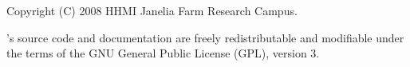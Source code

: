 \vspace*{\fill}
\begin{flushleft}
Copyright (C) 2008 HHMI Janelia Farm Research Campus.

\vspace{2em} 

's source code and documentation are freely
redistributable and modifiable under the terms of the GNU General
Public License (GPL), version 3.
\end{flushleft}
